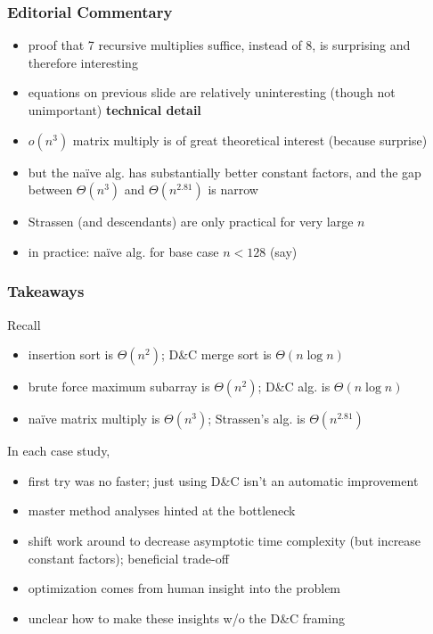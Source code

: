 \documentclass{beamer}
\begin{document}
\begin{frame} \frametitle{Editorial Commentary}
\begin{itemize}
  \item proof that 7 recursive multiplies suffice, instead of 8, is surprising
    and therefore interesting
  \item equations on previous slide are relatively uninteresting (though not
    unimportant) \textbf{technical detail}
  \item $o(n^3)$ matrix multiply is of great theoretical interest (because
    surprise)
  \item but the na\"ive alg. has substantially better constant factors, and
    the gap between $\Theta(n^3)$ and $\Theta(n^{2.81})$ is narrow
  \item Strassen (and descendants) are only practical for very large $n$
  \item in practice: na\"ive alg. for base case $n<128$ (say)
\end{itemize}
\end{frame}

\begin{frame} \frametitle{Takeaways}
Recall
\begin{itemize}
  \item insertion sort is $\Theta(n^2)$; D\&C merge sort is $\Theta(n \log n)$
  \item brute force maximum subarray is $\Theta(n^2)$; D\&C alg. is $\Theta(n \log n)$
  \item na\"ive matrix multiply is $\Theta(n^3)$; Strassen's alg. is $\Theta(n^{2.81})$
\end{itemize}
In each case study,
\begin{itemize}
  \item first try was no faster; just using D\&C isn't an automatic improvement
  \item master method analyses hinted at the bottleneck
  \item shift work around to decrease asymptotic time complexity (but increase
    constant factors); beneficial trade-off
  \item optimization comes from human insight into the problem
  \item unclear how to make these insights w/o the D\&C framing
\end{itemize}
\end{frame}
\end{document}
